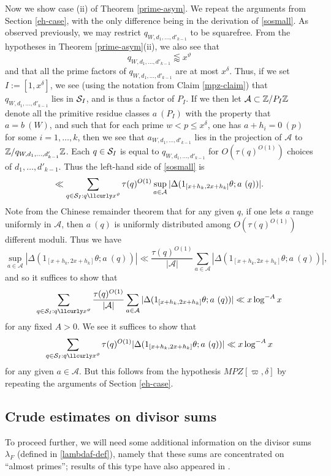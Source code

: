 Now we show case (ii) of Theorem \ref{prime-asym}.  We repeat the arguments from Section \ref{eh-case}, with the only difference being in the derivation of \eqref{sosmall}.  As observed previously, we may restrict $q_{W,d_1,\dots,d'_{k-1}}$ to be squarefree.  From the hypotheses in Theorem \ref{prime-asym}(ii), we also see that
$$ q_{W,d_1,\dots,d'_{k-1}} \lessapprox x^\vartheta$$
and that all the prime factors of $q_{W,d_1,\dots,d'_{k-1}}$ are at most $x^\delta$.  Thus, if we set $I := [1,x^\delta]$, we see (using the notation from Claim \ref{mpz-claim}) that $q_{W,d_1,\dots,d'_{k-1}}$ lies in $\mathcal{S}_I$, and is thus a factor of $P_I$.  If we then let ${\mathcal A} \subset \mathbb{Z}/P_I\mathbb{Z}$ denote all the primitive residue classes $a\ (P_I)$ with the property that $a = b\ (W)$, and such that for each prime $w < p \leq x^\delta$, one has $a + h_i = 0\ (p)$ for some $i=1,\dots,k$, then we see that $a_{W,d_1,\dots,d'_{k-1}}$ lies in the projection of ${\mathcal A}$ to $\mathbb{Z}/q_{W,d_1,\dots,d'_{k-1}}\mathbb{Z}$.  Each $q \in \mathcal{S}_I$ is equal to $q_{W,d_1,\dots,d'_{k-1}}$ for $O(\tau(q)^{O(1)})$ choices of $d_1,\dots,d'_{k-1}$.  Thus the left-hand side of \eqref{sosmall} is
$$ \ll \sum_{q \in \Scal_I: q \lessapprox x^\vartheta} \tau(q)^{O(1)} \sup_{a \in {\mathcal A}}
|\Delta( 1_{[x+h_k,2x+h_k]} \theta;  a\ (q))|.$$
Note from the Chinese remainder theorem that for any given $q$, if one lets $a$ range uniformly in ${\mathcal A}$, then $a\ (q)$ is uniformly distributed among $O( \tau(q)^{O(1)})$ different moduli.  Thus we have
$$
\sup_{a \in {\mathcal A}}
|\Delta( 1_{[x+h_k,2x+h_k]} \theta;  a\ (q))| \ll \frac{\tau(q)^{O(1)}}{|{\mathcal A}|} \sum_{a \in {\mathcal A}} |\Delta( 1_{[x+h_k,2x+h_k]} \theta;  a\ (q))|, $$
and so it suffices to show that
$$
\sum_{q \in \Scal_I: q \lessapprox x^\vartheta} \frac{\tau(q)^{O(1)}}{|{\mathcal A}|} \sum_{a \in {\mathcal A}}
|\Delta( 1_{[x+h_k,2x+h_k]} \theta;  a\ (q))|\ll x \log^{-A} x$$
for any fixed $A>0$.  We see it suffices to show that
$$
\sum_{q \in \Scal_I: q \lessapprox x^\vartheta} \tau(q)^{O(1)}
|\Delta( 1_{[x+h_k,2x+h_k]} \theta;  a\ (q))|\ll x \log^{-A} x$$
for any given $a \in {\mathcal A}$.  But this follows from the hypothesis $MPZ[\varpi,\delta]$ by repeating the arguments of Section \ref{eh-case}.

\subsection{Crude estimates on divisor sums}

To proceed further, we will need some additional information on the divisor sums $\lambda_F$ (defined in \eqref{lambdaf-def}), namely that these sums are concentrated on ``almost primes''; results of this type have also appeared in \cite{pintz-szemeredi}.

